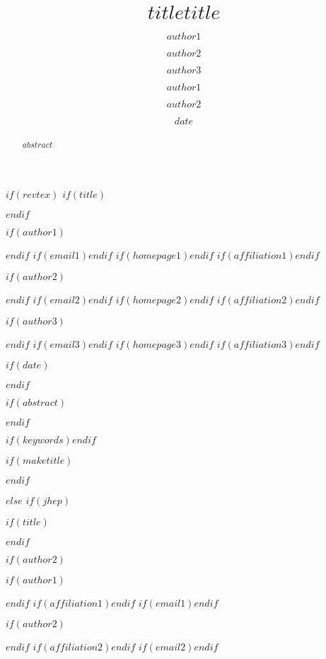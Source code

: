 \documentclass[$if(fontsize)$$fontsize$,$endif$$if(lang)$$lang$,$endif$$if(papersize)$$papersize$,$endif$$for(classoption)$$classoption$$sep$,$endfor$]{$documentclass$}
\begin{document}


$if(revtex)$
$if(title)$\title{$title$}$endif$

$if(author1)$\author{$author1$}$endif$
$if(email1)$$endif$
$if(homepage1)$$endif$
$if(affiliation1)$$endif$

$if(author2)$\author{$author2$}$endif$
$if(email2)$$endif$
$if(homepage2)$$endif$
$if(affiliation2)$$endif$

$if(author3)$\author{$author3$}$endif$
$if(email3)$$endif$
$if(homepage3)$$endif$
$if(affiliation3)$$endif$

$if(date)$\date{$date$}$endif$

$if(abstract)$
\begin{abstract}
$abstract$
\end{abstract}
$endif$

$if(keywords)$$endif$

$if(maketitle)$\maketitle$endif$

$else$
$if(jhep)$

$if(title)$\title{\boldmath $title$}$endif$

$if(author2)$

$if(author1)$\author[a]{$author1$}$endif$
$if(affiliation1)$$endif$
$if(email1)$$endif$

$if(author2)$\author[b]{$author2$}$endif$
$if(affiliation2)$$endif$
$if(email2)$$endif$
\end{document}
